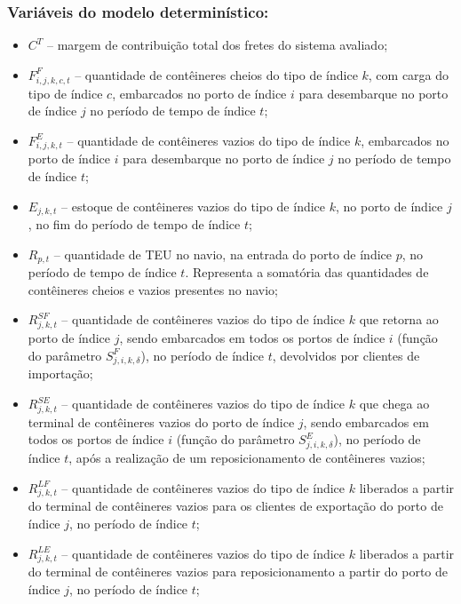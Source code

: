 \documentclass[preprint,10pt,5p]{elsarticle}
\begin{document}
\subsubsection{Variáveis do modelo determinístico:}
\begin{itemize}
    \item \(C^T\) – margem de contribuição total dos fretes do sistema avaliado;
    \item \(F_{i,j,k,c,t}^{F}\) – quantidade de contêineres cheios do tipo de índice \(k\), com carga do tipo de índice \(c\), embarcados no porto de índice \(i\) para desembarque no porto de índice \(j\) no período de tempo de índice \(t\);
    \item \(F_{i,j,k,t}^{E}\) – quantidade de contêineres vazios do tipo de índice \(k\), embarcados no porto de índice \(i\) para desembarque no porto de índice \(j\) no período de tempo de índice \(t\);
    \item \(E_{j,k,t}\) – estoque de contêineres vazios do tipo de índice \(k\), no porto de índice \(j\), no fim do período de tempo de índice \(t\);
    \item \(R_{p,t}\) – quantidade de TEU no navio, na entrada do porto de índice \(p\), no período de tempo de índice \(t\). Representa a somatória das quantidades de contêineres cheios e vazios presentes no navio;
    \item \(R_{j,k,t}^{SF}\) – quantidade de contêineres vazios do tipo de índice \(k\) que retorna ao porto de índice \(j\), sendo embarcados em todos os portos de índice \(i\) (função do parâmetro \(S_{j,i,k,\delta}^{F}\)), no período de índice \(t\), devolvidos por clientes de importação;
    \item \(R_{j,k,t}^{SE}\) – quantidade de contêineres vazios do tipo de índice \(k\) que chega ao terminal de contêineres vazios do porto de índice \(j\), sendo embarcados em todos os portos de índice \(i\) (função do parâmetro \(S_{j,i,k,\delta}^{E}\)), no período de índice \(t\), após a realização de um reposicionamento de contêineres vazios;
    \item \(R_{j,k,t}^{LF}\) – quantidade de contêineres vazios do tipo de índice \(k\) liberados a partir do terminal de contêineres vazios para os clientes de exportação do porto de índice \(j\), no período de índice \(t\);
    \item \(R_{j,k,t}^{LE}\) – quantidade de contêineres vazios do tipo de índice \(k\) liberados a partir do terminal de contêineres vazios para reposicionamento a partir do porto de índice \(j\), no período de índice \(t\);
\end{itemize}
\end{document}
